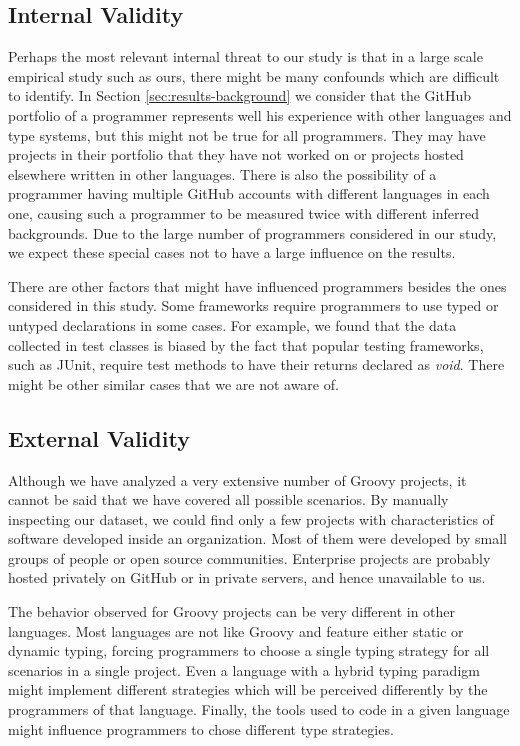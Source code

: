 \documentclass[]{sigplanconf}
\begin{document}
\subsection*{Internal Validity}
Perhaps the most relevant internal threat to our study is that in a large scale empirical study such as ours, there might be many confounds which are difficult to identify.
In Section \ref{sec:results-background} we consider that the GitHub portfolio of a programmer represents well his experience with other languages and type systems, but this might not be true for all programmers.
They may have projects in their portfolio that they have not worked on or projects hosted elsewhere written in other languages.
There is also the possibility of a programmer having multiple GitHub accounts with different languages in each one, causing such a programmer to be measured twice with different inferred backgrounds.
Due to the large number of programmers considered in our study, we expect these special cases not to have a large influence on the results.

There are other factors that might have influenced programmers besides the ones considered in this study.
Some frameworks require programmers to use typed or untyped declarations in some cases.
For example, we found that the data collected in test classes is biased by the fact that popular testing frameworks, such as JUnit, require test methods to have their returns declared as \emph{void}.
There might be other similar cases that we are not aware of.

\subsection*{External Validity}
Although we have analyzed a very extensive number of Groovy projects, it cannot be said that we have covered all possible scenarios.
By manually inspecting our dataset, we could find only a few projects with characteristics of software developed inside an organization.
Most of them were developed by small groups of people or open source communities.
Enterprise projects are probably hosted privately on GitHub or in private servers, and hence unavailable to us.

The behavior observed for Groovy projects can be very different in other languages.
Most languages are not like Groovy and feature either static or dynamic typing, forcing programmers to choose a single typing strategy for all scenarios in a single project.
Even a language with a hybrid typing paradigm might implement different strategies which will be perceived differently by the programmers of that language.
Finally, the tools used to code in a given language might influence programmers to chose different type strategies.
\end{document}
